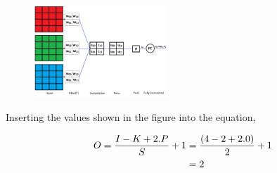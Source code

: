 \begin{vbframe}
 \begin{figure}
    \centering
    \includegraphics[width=5cm]{figure/3channel.png}
  \end{figure}

Inserting the values shown in the figure into the equation,

\begin{align} 
O= \frac{I - K + 2.P}{S} + 1&={(4 - 2 + 2.0)\over 2} + 1\\ 
&=2 
\end{align}

\end{vbframe}




\endlecture

